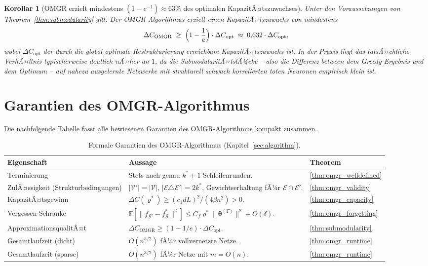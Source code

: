 ﻿\documentclass[12pt, a4paper, openany]{report}
\newtheorem{corollary}[theorem]{Korollar}
\newcommand{\E}{\mathbb{E}}
\newcommand{\calG}{\mathcal{G}}
\newcommand{\calV}{\mathcal{V}}
\newcommand{\calE}{\mathcal{E}}
\begin{document}
\begin{corollary}[OMGR erzielt mindestens $(1-e^{-1}) \approx 63\%$ des optimalen KapazitÃ¤tszuwachses]
\label{cor:omgr_approx}
Unter den Voraussetzungen von Theorem~\ref{thm:submodularity} gilt:
Der OMGR-Algorithmus erzielt einen KapazitÃ¤tszuwachs von mindestens
\[
  \Delta C_{\mathrm{OMGR}}
  \;\geq\;
  \Bigl(1 - \frac{1}{e}\Bigr) \cdot \Delta C_{\mathrm{opt}}
  \;\approx\; 0{,}632 \cdot \Delta C_{\mathrm{opt}},
\]
wobei $\Delta C_{\mathrm{opt}}$ der durch die global optimale Restrukturierung
erreichbare KapazitÃ¤tszuwachs ist.  In der Praxis liegt das tatsÃ¤chliche
VerhÃ¤ltnis typischerweise deutlich nÃ¤her an $1$, da die SubmodularitÃ¤tslÃ¼cke
-- also die Differenz between dem Greedy-Ergebnis und dem Optimum -- auf
nahezu ausgelernte Netzwerke mit strukturell schwach korrelierten toten
Neuronen empirisch klein ist.
\end{corollary}

\section{Garantien des OMGR-Algorithmus}
\label{sec:algo_summary}

Die nachfolgende Tabelle fasst alle bewiesenen Garantien des OMGR-Algorithmus
kompakt zusammen.

\begin{table}[H]
\centering
\caption{Formale Garantien des OMGR-Algorithmus (Kapitel~\ref{sec:algorithm}).}
\label{tab:omgr_guarantees}
\renewcommand{\arraystretch}{1.35}
\begin{tabularx}{\linewidth}{@{}l X l@{}}
\toprule
\textbf{Eigenschaft} & \textbf{Aussage} & \textbf{Theorem} \\
\midrule
Terminierung
  & Stets nach genau $k^* + 1$ Schleifenrunden.
  & \ref{thm:omgr_welldefined} \\
ZulÃ¤ssigkeit (Strukturbedingungen)
  & $|\calV'|=|\calV|$, $|\calE\triangle\calE'|=2k^*$,
    Gewichtserhaltung fÃ¼r $\calE\cap\calE'$.
  & \ref{thm:omgr_validity} \\
KapazitÃ¤tsgewinn
  & $\Delta C(\varrho^*) \geq (c_1 dL)^2/(4\beta n^2) > 0$.
  & \ref{thm:omgr_capacity} \\
Vergessen-Schranke
  & $\E[\|f_{\calG'}-f^*_\calG\|^2] \leq C_f\varrho^*\|\bm\theta^{(T)}\|^2+O(\delta)$.
  & \ref{thm:omgr_forgetting} \\
ApproximationsqualitÃ¤t
  & $\Delta C_{\mathrm{OMGR}} \geq (1-1/e)\cdot\Delta C_{\mathrm{opt}}$.
  & \ref{thm:submodularity} \\
Gesamtlaufzeit (dicht)
  & $O(n^{5/2})$ fÃ¼r vollvernetzte Netze.
  & \ref{thm:omgr_runtime} \\
Gesamtlaufzeit (sparse)
  & $O(n^{3/2})$ fÃ¼r Netze mit $m = O(n)$.
  & \ref{thm:omgr_runtime} \\
\bottomrule
\end{tabularx}
\end{table}
\end{document}
